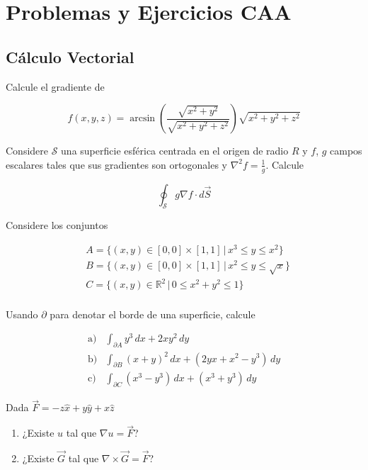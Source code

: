 \section{Problemas y Ejercicios CAA}

\subsection{Cálculo Vectorial}

\np

Calcule el gradiente de

\[f(x, y, z)=\arcsin\left(\frac{\sqrt{x^2+y^2}}{\sqrt{x^2+y^2+z^2}}\right)
\sqrt{x^2+y^2+z^2}\]

\np

Considere $\mathcal{S}$ una superficie esférica centrada en el origen de radio $R$ y $f$, $g$ campos escalares tales que sus gradientes son ortogonales y $\nabla^2 f = \frac{1}{g}$. Calcule

\[\oint_\mathcal{S}g\nabla f\cdot d\Vec{S}\]

\np

Considere los conjuntos

\begin{equation}
\begin{split}
    & A = \{(x,y)\in [0,0]\times[1,1]\,|\,x^3\leq y\leq x^2\}\\
    & B = \{(x,y)\in [0,0]\times[1,1]\,|\,x^2\leq y\leq \sqrt{x}\}\\
    & C = \{(x,y)\in \mathbb{R}^2\,|\, 0 \leq x^2+y^2\leq 1\}\\
\end{split}
\nonumber
\end{equation}

Usando $\partial$ para denotar el borde de una superficie, calcule

\begin{equation}
\begin{split}
    \mathrm{a})& \int_{\partial A} y^3\,dx + 2xy^2\,dy\\
    \mathrm{b})& \int_{\partial B} (x+y)^2\,dx + (2yx + x^2 - y^3)\,dy\\
    \mathrm{c})& \int_{\partial C} (x^3-y^3)\,dx + (x^3+y^3)\,dy
\end{split}
\nonumber
\end{equation}

\np

Dada $\Vec{F}= -z\hat{x}+y\hat{y}+x\hat{z}$

\begin{enumerate}[label=\alph*)]
    \item ¿Existe $u$ tal que $\nabla u = \Vec{F}$?
    \item ¿Existe $\Vec{G}$ tal que $\nabla\times
    \Vec{G}=\Vec{F}$?
\end{enumerate}

